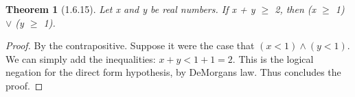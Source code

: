\documentclass[a4paper, 12pt]{article}
\theoremstyle{plain}
\newtheorem*{theorem*}{Theorem}
\begin{document}
	
	\begin{theorem*}[1.6.15]
		Let x and y be real numbers. If x + y $\ge$ 2, then \newline (x $\ge$ 1) $\lor$ (y $\ge$ 1).
	\end{theorem*}
	
	\begin{proof}
		By the contrapositive. Suppose it were the case that \newline $(x < 1) \land (y < 1)$. We can 
		simply add the inequalities: $x + y < 1 + 1 = 2$. This is the logical negation for the direct 
		form hypothesis, by DeMorgans law. Thus concludes the proof.
	\end{proof}
\end{document}
